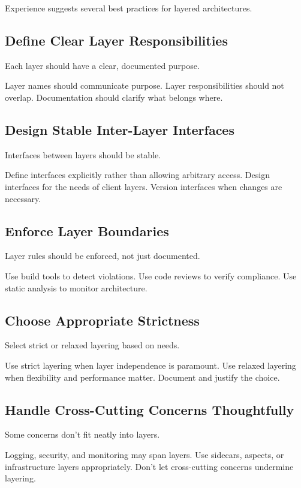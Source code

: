 \documentclass[11pt]{article}
\begin{document}
Experience suggests several best practices for layered architectures.

\subsection{Define Clear Layer Responsibilities}

Each layer should have a clear, documented purpose.

Layer names should communicate purpose. Layer responsibilities should not overlap. Documentation should clarify what belongs where.

\subsection{Design Stable Inter-Layer Interfaces}

Interfaces between layers should be stable.

Define interfaces explicitly rather than allowing arbitrary access. Design interfaces for the needs of client layers. Version interfaces when changes are necessary.

\subsection{Enforce Layer Boundaries}

Layer rules should be enforced, not just documented.

Use build tools to detect violations. Use code reviews to verify compliance. Use static analysis to monitor architecture.

\subsection{Choose Appropriate Strictness}

Select strict or relaxed layering based on needs.

Use strict layering when layer independence is paramount. Use relaxed layering when flexibility and performance matter. Document and justify the choice.

\subsection{Handle Cross-Cutting Concerns Thoughtfully}

Some concerns don't fit neatly into layers.

Logging, security, and monitoring may span layers. Use sidecars, aspects, or infrastructure layers appropriately. Don't let cross-cutting concerns undermine layering.
\end{document}
